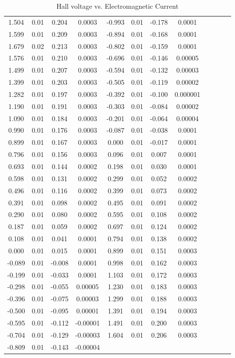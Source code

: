 \begin{enumerate}[resume]
\begin{table}[h]
\begin{tabular}{|c|c|c|c|c|c|c|c|c|c|c|c|}
      1.504&0.01&0.204&0.0003&-0.993&0.01&-0.178&0.0001\\
      1.599&0.01&0.209&0.0003&-0.894&0.01&-0.168&0.0001\\
      1.679&0.02&0.213&0.0003&-0.802&0.01&-0.159&0.0001\\
      1.576&0.01&0.210&0.0003&-0.696&0.01&-0.146&0.00005\\
      1.499&0.01&0.207&0.0003&-0.594&0.01&-0.132&0.00003\\
      1.399&0.01&0.203&0.0003&-0.505&0.01&-0.119&0.00002\\
      1.282&0.01&0.197&0.0003&-0.392&0.01&-0.100&0.000001\\
      1.190&0.01&0.191&0.0003&-0.303&0.01&-0.084&0.00002\\
      1.090&0.01&0.184&0.0003&-0.201&0.01&-0.064&0.00004\\
      0.990&0.01&0.176&0.0003&-0.087&0.01&-0.038&0.0001\\
      0.899&0.01&0.167&0.0003&0.000&0.01&-0.017&0.0001\\
      0.796&0.01&0.156&0.0003&0.096&0.01&0.007&0.0001\\
      0.693&0.01&0.144&0.0002&0.198&0.01&0.030&0.0001\\
      0.598&0.01&0.131&0.0002&0.299&0.01&0.052&0.0002\\
      0.496&0.01&0.116&0.0002&0.399&0.01&0.073&0.0002\\
      0.391&0.01&0.098&0.0002&0.495&0.01&0.091&0.0002\\
      0.290&0.01&0.080&0.0002&0.595&0.01&0.108&0.0002\\
      0.187&0.01&0.059&0.0002&0.697&0.01&0.124&0.0002\\
      0.108&0.01&0.041&0.0001&0.794&0.01&0.138&0.0002\\
      0.000&0.01&0.015&0.0001&0.899&0.01&0.151&0.0003\\
      -0.089&0.01&-0.008&0.0001&0.998&0.01&0.162&0.0003\\
      -0.199&0.01&-0.033&0.0001&1.103&0.01&0.172&0.0003\\
      -0.298&0.01&-0.055&0.00005&1.230&0.01&0.183&0.0003\\
      -0.396&0.01&-0.075&0.00003&1.299&0.01&0.188&0.0003\\
      -0.500&0.01&-0.095&0.00001&1.391&0.01&0.194&0.0003\\
      -0.595&0.01&-0.112&-0.00001&1.491&0.01&0.200&0.0003\\
      -0.704&0.01&-0.129&-0.00003&1.604&0.01&0.206&0.0003\\
      -0.809&0.01&-0.143&-0.00004&&&&\\
      \hline
    \end{tabular}
    \label{tbl:HMTable1}
    \caption{Hall voltage vs. Electromagnetic Current}
  \end{table}


\end{enumerate}
